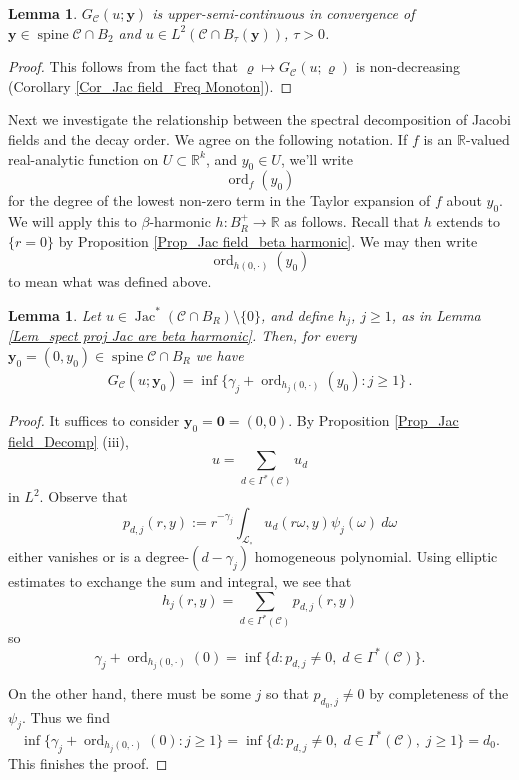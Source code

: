\documentclass[11pt, letterpaper, reqno]{amsart}
\numberwithin{equation}{section}
\newtheorem{Lem}[Def]{Lemma}
\theoremstyle{remark}
\newcommand{\RR}{\mathbb{R}}
\newcommand{\cC}{\mathcal{C}}
\newcommand{\cL}{\mathcal{L}}
\newcommand{\mbfy}{\mathbf{y}}
\newcommand{\Jac}{\operatorname{Jac}}
\newcommand{\spine}{\operatorname{spine}}
\newcommand{\Ord}{\operatorname{ord}}
\newcommand{\orig}{\mathbf{0}}
\begin{document}
 
\begin{Lem} \label{lemm:doubling.upper.semicontinuity}
$G_\cC(u; \mbfy)$ is upper-semi-continuous in convergence of $\mbfy\in \spine \cC\cap B_2$ and $u\in L^2(\cC \cap B_\tau(\mbfy))$, $\tau > 0$.
\end{Lem}
\begin{proof}
This follows from the fact that  $\varrho \mapsto G_\cC(u; \varrho)$ is non-decreasing (Corollary \ref{Cor_Jac field_Freq Monoton}). 
\end{proof}






    Next we investigate the relationship between the spectral decomposition of Jacobi fields and the decay order. We agree on the following notation. If $f$ is an $\RR$-valued real-analytic function on $U \subset \RR^k$, and $y_0 \in U$, we'll write
    \[ \Ord_f(y_0) \]
    for the degree of the lowest non-zero term in the Taylor expansion of $f$ about $y_0$. We will apply this to $\beta$-harmonic $h : B_R^+ \to \RR$ as follows. Recall that  $h$ extends to $\{r=0\}$ by Proposition \ref{Prop_Jac field_beta harmonic}. We may then write
    \[ \Ord_{h(0, \cdot)}(y_0) \]
to mean what was defined above.  

    \begin{Lem} \label{Lem_Jac field_N_C(u)=min(gamma_j+ord_h)}
      Let $u\in \Jac^*(\cC \cap B_R) \setminus \{0\}$, and define $h_j$, $j \geq 1$, as in Lemma \ref{Lem_spect proj Jac are beta harmonic}. Then, for every $\mbfy_0=(0,y_0)\in \spine \cC \cap B_R$ we have 
      \begin{align}
        G_\cC(u; \mbfy_0) = \inf\{\gamma_j+\Ord_{h_j(0, \cdot)}(y_0): j\geq 1\} \,. \label{Equ_Jac field_N_C(u)=min(gamma+ord)}
      \end{align}
    \end{Lem}
    \begin{proof}
    It suffices to consider $\mbfy_0 =\orig = (0,0)$. By Proposition \ref{Prop_Jac field_Decomp} {(iii)}, \[
        u = \sum_{d\in \Gamma^*(\cC)} u_d
      \]
      in $L^2$. Observe that 
      \[
       p_{d, j}(r, y):= r^{-\gamma_j}\int_{\cL_\circ} u_d(r\omega, y)\psi_j(\omega)\ d\omega 
      \]
      either vanishes or is a degree-$(d-\gamma_j)$ homogeneous polynomial. Using elliptic estimates to exchange the sum and integral, we see that
      \[
      h_j(r,y) = \sum_{d \in \Gamma^*(\cC)} p_{d,j}(r,y)
      \]
      so
      \[
      \gamma_j + \Ord_{h_j(0,\cdot)}(0) = \inf\{d : p_{d,j}\neq 0, \; d\in\Gamma^*(\cC)\}. 
      \]
      
      On the other hand, there must be some $j$ so that $p_{d_0,j} \neq 0$ by completeness of the $\psi_j$. Thus we find
      \[
      \inf\{\gamma_j + \Ord_{h_j(0,\cdot)}(0) : j\geq 1\}=\inf\{d : p_{d,j}\neq 0, \; d\in\Gamma^*(\cC), \; j \geq 1\} = d_0.
      \]
      This finishes the proof.
    \end{proof}
\end{document}

